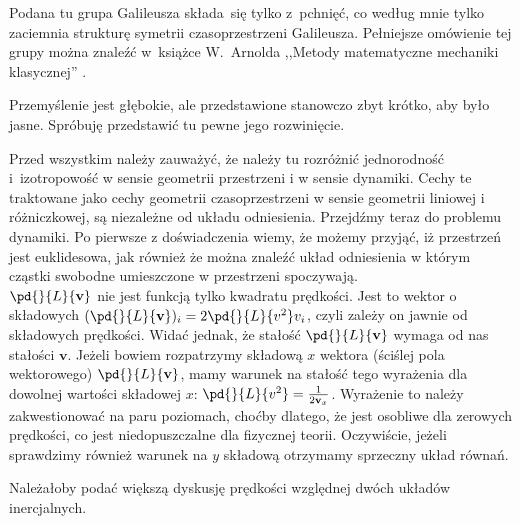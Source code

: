 \documentclass[a4paper,11pt]{article}
\begin{document}

\start {}


\vspace{\spaceTwo}








\start {} Podana tu grupa Galileusza składa~się tylko z~pchnięć,
co według mnie tylko zaciemnia strukturę symetrii czasoprzestrzeni
Galileusza. Pełniejsze omówienie tej grupy można znaleźć w~książce
W.~Arnolda ,,Metody matematyczne mechaniki klasycznej'' \cite{Arnold81}.

\start {} Przemyślenie jest głębokie, ale przedstawione
stanowczo zbyt krótko, aby było jasne. Spróbuję przedstawić tu pewne
jego rozwinięcie.

Przed wszystkim należy zauważyć, że należy tu rozróżnić jednorodność
i~izotropowość w sensie geometrii przestrzeni i w sensie dynamiki.
Cechy te traktowane jako cechy geometrii czasoprzestrzeni w sensie
geometrii liniowej i różniczkowej, są niezależne od układu
odniesienia. Przejdźmy teraz do problemu dynamiki. Po pierwsze z
doświadczenia wiemy, że możemy przyjąć, iż przestrzeń jest
euklidesowa, jak również że można znaleźć układ odniesienia w którym
cząstki swobodne umieszczone w przestrzeni spoczywają. \\
\start {} $\pd{}{ L }{ \mathbf{ v } }$ nie jest funkcją tylko
kwadratu prędkości. Jest to wektor o składowych
$( \pd{}{ L }{ \mathbf{ v }} )_{ i } = 2 \pd{}{ L }{ { v^{ 2 } } } v_{
  i }$, czyli zależy on jawnie od składowych prędkości. Widać jednak,
że stałość $\pd{}{ L }{ \mathbf{ v } }$ wymaga od nas stałości
$\mathbf{ v }$. Jeżeli bowiem rozpatrzymy składową $x$ wektora
(ściślej pola wektorowego) $\pd{}{ L }{ \mathbf{ v } }$, mamy warunek
na stałość tego wyrażenia dla dowolnej wartości składowej $x$:
$\pd{}{ L }{ { v^{ 2 } } } = \frac{ 1 }{ 2 \mathbf{ v }_{ x } }$.
Wyrażenie to należy zakwestionować na paru poziomach, choćby dlatego,
że jest osobliwe dla zerowych prędkości, co jest niedopuszczalne dla
fizycznej teorii. Oczywiście, jeżeli sprawdzimy również warunek na
$ y $ składową otrzymamy sprzeczny układ równań.

\start {} Należałoby podać większą dyskusję prędkości względnej
dwóch układów inercjalnych.
\end{document}
